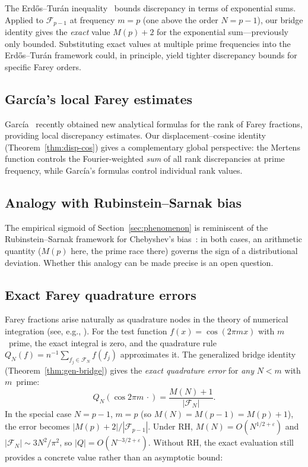 \documentclass[11pt]{article}
\theoremstyle{definition}
\newcommand{\F}{\mathcal{F}}
\begin{document}
The Erd\H{o}s--Tur\'an inequality~\cite{ErdosTuran1948} bounds
discrepancy in terms of exponential sums.  Applied to $\F_{p-1}$
at frequency $m = p$ (one above the order $N = p-1$), our bridge
identity gives the \emph{exact} value $M(p) + 2$ for the
exponential sum---previously only bounded.  Substituting exact
values at multiple prime frequencies into the Erd\H{o}s--Tur\'an
framework could, in principle, yield tighter discrepancy bounds
for specific Farey orders.

\subsection{Garc\'ia's local Farey estimates}

Garc\'ia~\cite{Garcia2025} recently obtained new analytical formulas
for the rank of Farey fractions, providing local discrepancy
estimates.  Our displacement--cosine identity (Theorem~\ref{thm:disp-cos})
gives a complementary global perspective: the Mertens function
controls the Fourier-weighted \emph{sum} of all rank discrepancies
at prime frequency, while Garc\'ia's formulas control individual
rank values.

\subsection{Analogy with Rubinstein--Sarnak bias}

The empirical sigmoid of Section~\ref{sec:phenomenon} is
reminiscent of the Rubinstein--Sarnak framework for Chebyshev's
bias~\cite{RubinsteinSarnak1994}: in both cases, an arithmetic
quantity ($M(p)$ here, the prime race there) governs the sign of
a distributional deviation.  Whether this analogy can be made
precise is an open question.

\subsection{Exact Farey quadrature errors}

Farey fractions arise naturally as quadrature nodes in the
theory of numerical integration (see, e.g.,
\cite{Niederreiter1992}).  For the test function $f(x) = \cos(2\pi mx)$
with $m$~prime, the exact integral is zero, and the quadrature
rule $Q_N(f) = n^{-1}\sum_{f_j \in \F_N} f(f_j)$ approximates it.
The generalized bridge identity (Theorem~\ref{thm:gen-bridge})
gives the \emph{exact quadrature error} for \emph{any} $N < m$
with $m$~prime:
\[
  Q_N(\cos 2\pi m\,\cdot)
  = \frac{M(N) + 1}{|\F_N|}.
\]
In the special case $N = p-1$, $m = p$ (so $M(N) = M(p-1) = M(p)+1$),
the error becomes $|M(p)+2|/|\F_{p-1}|$.  Under RH,
$M(N) = O(N^{1/2+\varepsilon})$ and $|\F_N| \sim 3N^2/\pi^2$,
so $|Q| = O(N^{-3/2+\varepsilon})$.  Without RH, the exact evaluation
still provides a concrete value rather than an asymptotic bound:
\end{document}
